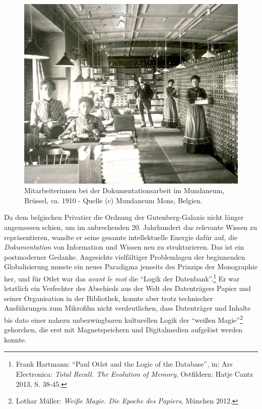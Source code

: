 \begin{figure}[htbp]
\centering
\includegraphics{img/Mundaneum1.png}
\caption{Mitarbeiterinnen bei der Dokumentationsarbeit im Mundaneum,
Brüssel, ca. 1910 - Quelle (c) Mundaneum Mons, Belgien.}
\end{figure}

Da dem belgischen Privatier die Ordnung der Gutenberg-Galaxis nicht
länger angemessen schien, um im anbrechenden 20. Jahrhundert das
relevante Wissen zu repräsentieren, wandte er seine gesamte
intellektuelle Energie dafür auf, die \emph{Dokumentation} von
Information und Wissen neu zu strukturieren. Das ist ein postmoderner
Gedanke. Angesichts vielfältiger Problemlagen der beginnenden
Globalisierung musste ein neues Paradigma jenseits des Prinzips der
Monographie her, und für Otlet war das \emph{avant le mot} die
\enquote{Logik der Datenbank}.\footnote{Frank Hartmann: \enquote{Paul
  Otlet and the Logic of the Database}, in: Ars Electronica: \emph{Total
  Recall. The Evolution of Memory}, Ostfildern: Hatje Cantz 2013, S.
  38-45.} Er war letztlich ein Verfechter des Abschieds aus der Welt des
Datenträgers Papier und seiner Organisation in der Bibliothek, konnte
aber trotz technischer Ausführungen zum Mikrofilm nicht verdeutlichen,
dass Datenträger und Inhalte bis dato einer nahezu unbezwingbaren
kulturellen Logik der \enquote{weißen Magie}\footnote{Lothar Müller:
  \emph{Weiße Magie. Die Epoche des Papiers}, München 2012.} gehorchen,
die erst mit Magnetspeichern und Digitalmedien aufgelöst werden konnte.

